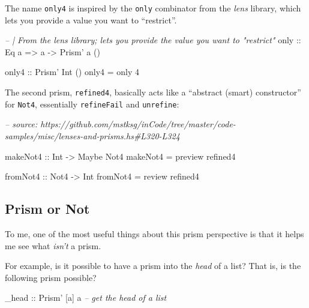 \documentclass[]{article}
\newenvironment{Shaded}{}{}
\newcommand{\CommentTok}[1]{\textcolor[rgb]{0.38,0.63,0.69}{\textit{#1}}}
\newcommand{\DataTypeTok}[1]{\textcolor[rgb]{0.56,0.13,0.00}{#1}}
\newcommand{\DecValTok}[1]{\textcolor[rgb]{0.25,0.63,0.44}{#1}}
\newcommand{\FunctionTok}[1]{\textcolor[rgb]{0.02,0.16,0.49}{#1}}
\newcommand{\NormalTok}[1]{#1}
\newcommand{\OtherTok}[1]{\textcolor[rgb]{0.00,0.44,0.13}{#1}}
\begin{document}
The name \texttt{only4} is inspired by the \texttt{only} combinator from the
\emph{lens} library, which lets you provide a value you want to ``restrict''.

\begin{Shaded}
\begin{Highlighting}[]
\CommentTok{-- | From the lens library; lets you provide the value you want to "restrict"}
\OtherTok{only ::} \DataTypeTok{Eq}\NormalTok{ a }\OtherTok{=>}\NormalTok{ a }\OtherTok{->} \DataTypeTok{Prism'}\NormalTok{ a ()}

\OtherTok{only4 ::} \DataTypeTok{Prism'} \DataTypeTok{Int}\NormalTok{ ()}
\NormalTok{only4 }\FunctionTok{=}\NormalTok{ only }\DecValTok{4}
\end{Highlighting}
\end{Shaded}

The second prism, \texttt{refined4}, basically acts like a ``abstract (smart)
constructor'' for \texttt{Not4}, essentially \texttt{refineFail} and
\texttt{unrefine}:

\begin{Shaded}
\begin{Highlighting}[]
\CommentTok{-- source: https://github.com/mstksg/inCode/tree/master/code-samples/misc/lenses-and-prisms.hs#L320-L324}

\OtherTok{makeNot4 ::} \DataTypeTok{Int} \OtherTok{->} \DataTypeTok{Maybe} \DataTypeTok{Not4}
\NormalTok{makeNot4 }\FunctionTok{=}\NormalTok{ preview refined4}

\OtherTok{fromNot4 ::} \DataTypeTok{Not4} \OtherTok{->} \DataTypeTok{Int}
\NormalTok{fromNot4 }\FunctionTok{=}\NormalTok{ review refined4}
\end{Highlighting}
\end{Shaded}

\hypertarget{prism-or-not}{%
\subsection{Prism or Not}\label{prism-or-not}}

To me, one of the most useful things about this prism perspective is that it
helps me see what \emph{isn't} a prism.

For example, is it possible to have a prism into the \emph{head} of a list? That
is, is the following prism possible?

\begin{Shaded}
\begin{Highlighting}[]
\OtherTok{_head ::} \DataTypeTok{Prism'}\NormalTok{ [a] a           }\CommentTok{-- get the head of a list}
\end{Highlighting}
\end{Shaded}
\end{document}
